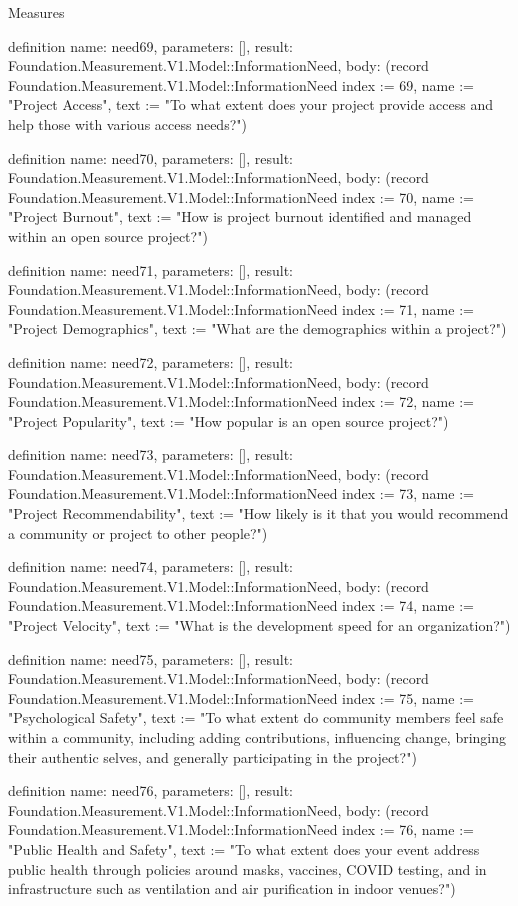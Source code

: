 \begin{lexlean}{Measures}
\begin{semanticmodule}
definition{
  name: need69,
  parameters: [],
  result: Foundation.Measurement.V1.Model::InformationNeed,
  body: (record Foundation.Measurement.V1.Model::InformationNeed {index := 69, name := "Project Access", text := "To what extent does your project provide access and help those with various access needs?"})
}

definition{
  name: need70,
  parameters: [],
  result: Foundation.Measurement.V1.Model::InformationNeed,
  body: (record Foundation.Measurement.V1.Model::InformationNeed {index := 70, name := "Project Burnout", text := "How is project burnout identified and managed within an open source project?"})
}

definition{
  name: need71,
  parameters: [],
  result: Foundation.Measurement.V1.Model::InformationNeed,
  body: (record Foundation.Measurement.V1.Model::InformationNeed {index := 71, name := "Project Demographics", text := "What are the demographics within a project?"})
}

definition{
  name: need72,
  parameters: [],
  result: Foundation.Measurement.V1.Model::InformationNeed,
  body: (record Foundation.Measurement.V1.Model::InformationNeed {index := 72, name := "Project Popularity", text := "How popular is an open source project?"})
}

definition{
  name: need73,
  parameters: [],
  result: Foundation.Measurement.V1.Model::InformationNeed,
  body: (record Foundation.Measurement.V1.Model::InformationNeed {index := 73, name := "Project Recommendability", text := "How likely is it that you would recommend a community or project to other people?"})
}

definition{
  name: need74,
  parameters: [],
  result: Foundation.Measurement.V1.Model::InformationNeed,
  body: (record Foundation.Measurement.V1.Model::InformationNeed {index := 74, name := "Project Velocity", text := "What is the development speed for an organization?"})
}

definition{
  name: need75,
  parameters: [],
  result: Foundation.Measurement.V1.Model::InformationNeed,
  body: (record Foundation.Measurement.V1.Model::InformationNeed {index := 75, name := "Psychological Safety", text := "To what extent do community members feel safe within a community, including adding contributions, influencing change, bringing their authentic selves, and generally participating in the project?"})
}

definition{
  name: need76,
  parameters: [],
  result: Foundation.Measurement.V1.Model::InformationNeed,
  body: (record Foundation.Measurement.V1.Model::InformationNeed {index := 76, name := "Public Health and Safety", text := "To what extent does your event address public health through policies around masks, vaccines, COVID testing, and in infrastructure such as ventilation and air purification in indoor venues?"})
}


\end{semanticmodule}
\end{lexlean}
